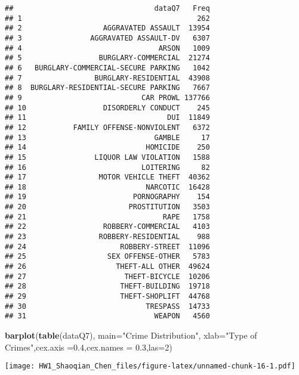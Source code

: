 \documentclass[]{article}
\newenvironment{Shaded}{\begin{snugshade}}{\end{snugshade}}
\newcommand{\DataTypeTok}[1]{\textcolor[rgb]{0.13,0.29,0.53}{#1}}
\newcommand{\DecValTok}[1]{\textcolor[rgb]{0.00,0.00,0.81}{#1}}
\newcommand{\FloatTok}[1]{\textcolor[rgb]{0.00,0.00,0.81}{#1}}
\newcommand{\KeywordTok}[1]{\textcolor[rgb]{0.13,0.29,0.53}{\textbf{#1}}}
\newcommand{\NormalTok}[1]{#1}
\newcommand{\StringTok}[1]{\textcolor[rgb]{0.31,0.60,0.02}{#1}}
\begin{document}
\begin{verbatim}
##                                 dataQ7   Freq
## 1                                         262
## 2                   AGGRAVATED ASSAULT  13954
## 3                AGGRAVATED ASSAULT-DV   6307
## 4                                ARSON   1009
## 5                  BURGLARY-COMMERCIAL  21274
## 6   BURGLARY-COMMERCIAL-SECURE PARKING   1042
## 7                 BURGLARY-RESIDENTIAL  43908
## 8  BURGLARY-RESIDENTIAL-SECURE PARKING   7667
## 9                            CAR PROWL 137766
## 10                  DISORDERLY CONDUCT    245
## 11                                 DUI  11849
## 12           FAMILY OFFENSE-NONVIOLENT   6372
## 13                              GAMBLE     17
## 14                            HOMICIDE    250
## 15                LIQUOR LAW VIOLATION   1588
## 16                           LOITERING     82
## 17                 MOTOR VEHICLE THEFT  40362
## 18                            NARCOTIC  16428
## 19                         PORNOGRAPHY    154
## 20                        PROSTITUTION   3503
## 21                                RAPE   1758
## 22                  ROBBERY-COMMERCIAL   4103
## 23                 ROBBERY-RESIDENTIAL    988
## 24                      ROBBERY-STREET  11096
## 25                   SEX OFFENSE-OTHER   5783
## 26                     THEFT-ALL OTHER  49624
## 27                       THEFT-BICYCLE  10206
## 28                      THEFT-BUILDING  19718
## 29                      THEFT-SHOPLIFT  44768
## 30                            TRESPASS  14733
## 31                              WEAPON   4560
\end{verbatim}

\begin{Shaded}
\begin{Highlighting}[]
\KeywordTok{barplot}\NormalTok{(}\KeywordTok{table}\NormalTok{(dataQ7), }\DataTypeTok{main=}\StringTok{"Crime Distribution"}\NormalTok{,}
   \DataTypeTok{xlab=}\StringTok{"Type of Crimes"}\NormalTok{,}\DataTypeTok{cex.axis =}\FloatTok{0.4}\NormalTok{,}\DataTypeTok{cex.names =} \FloatTok{0.3}\NormalTok{,}\DataTypeTok{las=}\DecValTok{2}\NormalTok{)}
\end{Highlighting}
\end{Shaded}

\texttt{[image: HW1\_Shaoqian\_Chen\_files/figure-latex/unnamed-chunk-16-1.pdf]}
\end{document}
